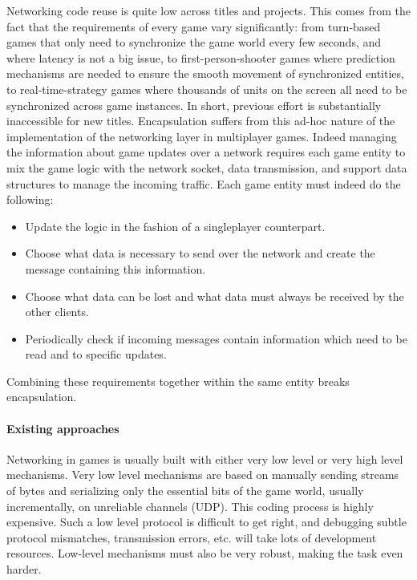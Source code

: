 Networking code reuse is quite low across titles and projects. This comes from the fact that the requirements of every game vary significantly: from turn-based games that only need to synchronize the game world every few seconds, and where latency is not a big issue, to first-person-shooter games where prediction mechanisms are needed to ensure the smooth movement of synchronized entities, to real-time-strategy games where thousands of units on the screen all need to be synchronized across game instances. In short, previous effort is substantially inaccessible for new titles. Encapsulation suffers from this ad-hoc nature of the implementation of the networking layer in multiplayer games. Indeed managing the information about game updates over a network requires each game entity to mix the game logic with the network socket, data transmission, and support data structures to manage the incoming traffic. Each game entity must indeed do the following:

\begin{itemize}
	\item Update the logic in the fashion of a singleplayer counterpart.
	\item Choose what data is necessary to send over the network and create the message containing this information.
	\item Choose what data can be lost and what data must always be received by the other clients.
	\item Periodically check if incoming messages contain information which need to be read and to specific updates.
\end{itemize}

Combining these requirements together within the same entity breaks encapsulation.

\paragraph*{Existing approaches}
Networking in games is usually built with either very low level or very high level mechanisms. Very low level mechanisms are based on manually sending streams of bytes and serializing only the essential bits of the game world, usually incrementally, on unreliable channels (UDP). This coding process is highly expensive. Such a low level protocol is difficult to get right, and debugging subtle protocol mismatches, transmission errors, etc. will take lots of development resources. Low-level mechanisms must also be very robust, making the task even harder.

